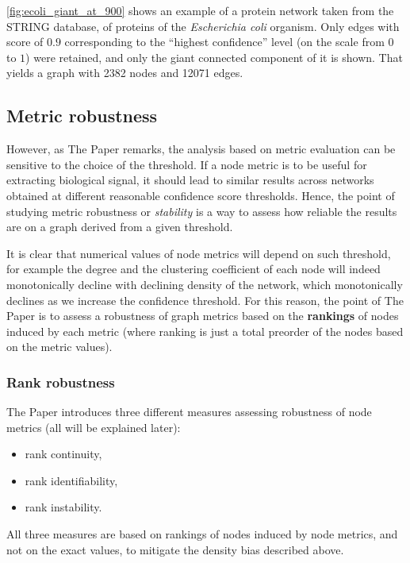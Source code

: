 \autoref{fig:ecoli_giant_at_900} shows an example of a protein network taken from the STRING database\cite{Szklarczyk2019}, of proteins of the \textit{Escherichia coli} organism.
Only edges with score of $0.9$ corresponding to the ``highest confidence'' level (on the scale from $0$ to $1$) were retained, and only the giant connected component of it is shown.
That yields a graph with 2382 nodes and 12071 edges.

\subsection{Metric robustness}

However, as The Paper remarks, the analysis based on metric evaluation can be sensitive to the choice of the threshold.
If a node metric is to be useful for extracting biological signal, it should lead to similar results across networks obtained at different reasonable confidence score thresholds.
Hence, the point of studying metric robustness or \textsl{stability} is a way to assess how reliable the results are on a graph derived from a given threshold.

It is clear that numerical values of node metrics will depend on such threshold, for example the degree and the clustering coefficient of each node will indeed monotonically decline with declining density of the network, which monotonically declines as we increase the confidence threshold.
For this reason, the point of The Paper is to assess a robustness of graph metrics based on the \textbf{rankings} of nodes induced by each metric (where ranking is just a total preorder of the nodes based on the metric values).

\subsubsection{Rank robustness}

The Paper introduces three different measures assessing robustness of node metrics (all will be explained later):
\begin{itemize}
    \item rank continuity,
    \item rank identifiability,
    \item rank instability.
\end{itemize}
All three measures are based on rankings of nodes induced by node metrics, and not on the exact values, to mitigate the density bias described above.

